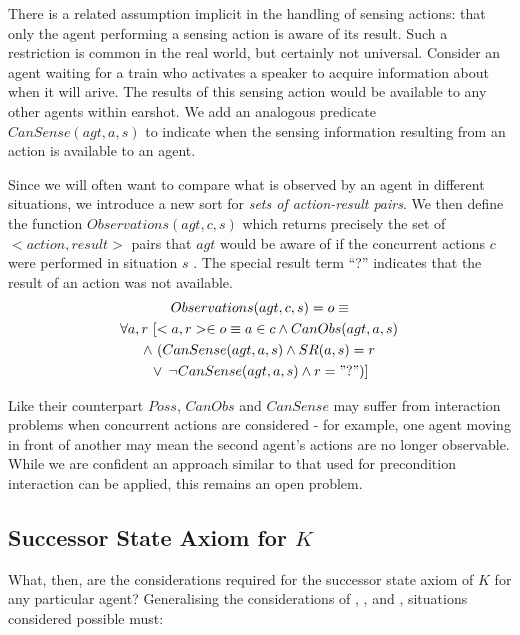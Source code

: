 \documentclass[letterpaper]{article}
\begin{document}
There is a related assumption implicit in the handling of sensing
actions: that only the agent performing a sensing action is aware
of its result. Such a restriction is common in the real world, but
certainly not universal. Consider an agent waiting for a train who
activates a speaker to acquire information about when it will arive.
The results of this sensing action would be available to any other
agents within earshot. We add an analogous predicate $CanSense(agt,a,s)$
to indicate when the sensing information resulting from an action
is available to an agent.

Since we will often want to compare what is observed by an agent in
different situations, we introduce a new sort for \emph{sets of action-result
pairs}. We then define the function $Observations(agt,c,s)$ which
returns precisely the set of $<action,result>$ pairs that $agt$
would be aware of if the concurrent actions $c$ were performed in
situation $s$ . The special result term {}``?'' indicates that
the result of an action was not available.
\begin{multline}
Observations(agt,c,s)=o\equiv\\
\forall a,r\,\left[<a,r>\in o\equiv a\in c\wedge CanObs(agt,a,s)\right.\\
\wedge\,\left(CanSense(agt,a,s)\wedge SR(a,s)=r\right.\\
\left.\vee\,\left.\neg CanSense(agt,a,s)\wedge r="?"\right)\right]
\end{multline}

Like their counterpart $Poss$, $CanObs$ and $CanSense$ may suffer
from interaction problems when concurrent actions are considered -
for example, one agent moving in front of another may mean the second
agent's actions are no longer observable. While we are confident
an approach similar to that used for precondition interaction can
be applied, this remains an open problem.

\subsection{Successor State Axiom for $K$}

What, then, are the considerations required for the successor state
axiom of $K$ for any particular agent? Generalising the considerations
of \cite{scherl03sc_knowledge}, \cite{scherl03conc_knowledge}, \cite{Lesperance99sitcalc_approach}
and \cite{shapiro01casl_feat_inter}, situations considered possible
must:
\end{document}
